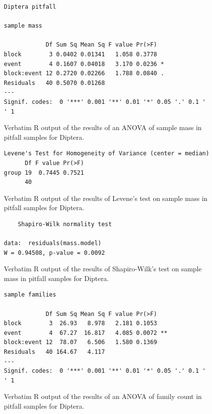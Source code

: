 \documentclass[10pt,letterpaper,twocolumn]{article}
\begin{document}
\begin{figure}[h]
	\lstset{numbers=left}
	\lstset{xleftmargin=5mm,framexleftmargin=5mm}
	\begin{lstlisting}
Diptera pitfall 

sample mass 

            Df Sum Sq Mean Sq F value Pr(>F)  
block        3 0.0402 0.01341   1.058 0.3778  
event        4 0.1607 0.04018   3.170 0.0236 *
block:event 12 0.2720 0.02266   1.788 0.0840 .
Residuals   40 0.5070 0.01268                 
---
Signif. codes:  0 '***' 0.001 '**' 0.01 '*' 0.05 '.' 0.1 ' ' 1
	\end{lstlisting}
	\caption{Verbatim R output of the results of an ANOVA of sample mass in pitfall samples for Diptera.}
	\label{fig:pitfall_diptera_mass_anova}
	\smallskip
	\nointerlineskip
	\hrulefill
\end{figure}

\begin{figure}[h]
	\lstset{numbers=left}
	\lstset{xleftmargin=5mm,framexleftmargin=5mm}
	\begin{lstlisting}
Levene's Test for Homogeneity of Variance (center = median)
      Df F value Pr(>F)
group 19  0.7445 0.7521
      40               
	\end{lstlisting}
	\caption{Verbatim R output of the results of Levene's test on sample mass in pitfall samples for Diptera.}
	\label{fig:pitfall_diptera_mass_levene}
	\smallskip
	\nointerlineskip
	\hrulefill
\end{figure}

\begin{figure}[h]
	\lstset{numbers=left}
	\lstset{xleftmargin=5mm,framexleftmargin=5mm}
	\begin{lstlisting}
	Shapiro-Wilk normality test

data:  residuals(mass.model)
W = 0.94508, p-value = 0.0092
	\end{lstlisting}
	\caption{Verbatim R output of the results of Shapiro-Wilk's test on sample mass in pitfall samples for Diptera.}
	\label{fig:pitfall_diptera_mass_shapiro}
	\smallskip
	\nointerlineskip
	\hrulefill
\end{figure}

\begin{figure}[h]
	\lstset{numbers=left}
	\lstset{xleftmargin=5mm,framexleftmargin=5mm}
	\begin{lstlisting}
sample families 

            Df Sum Sq Mean Sq F value Pr(>F)   
block        3  26.93   8.978   2.181 0.1053   
event        4  67.27  16.817   4.085 0.0072 **
block:event 12  78.07   6.506   1.580 0.1369   
Residuals   40 164.67   4.117                  
---
Signif. codes:  0 '***' 0.001 '**' 0.01 '*' 0.05 '.' 0.1 ' ' 1
	\end{lstlisting}
	\caption{Verbatim R output of the results of an ANOVA of family count in pitfall samples for Diptera.}
	\label{fig:pitfall_diptera_family_anova}
	\smallskip
	\nointerlineskip
	\hrulefill
\end{figure}
\end{document}
